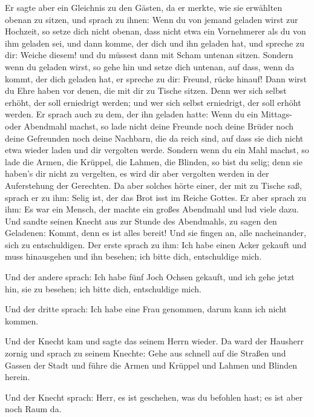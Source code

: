  Er sagte aber ein Gleichnis zu den Gästen, da er merkte,
wie sie erwählten obenan zu sitzen, und sprach zu ihnen: 
Wenn du von jemand geladen wirst zur Hochzeit, so setze dich nicht
obenan, dass nicht etwa ein Vornehmerer als du von ihm geladen sei,
 und dann komme, der dich und ihn geladen hat, und spreche
zu dir: Weiche diesem! und du müssest dann mit Scham untenan sitzen.
 Sondern wenn du geladen wirst, so gehe hin und setze
dich untenan, auf dass, wenn da kommt, der dich geladen hat, er spreche
zu dir: Freund, rücke hinauf! Dann wirst du Ehre haben vor denen, die
mit dir zu Tische sitzen.  Denn wer sich selbst erhöht,
der soll erniedrigt werden; und wer sich selbst erniedrigt, der soll
erhöht werden.  Er sprach auch zu dem, der ihn geladen
hatte: Wenn du ein Mittags- oder Abendmahl machst, so lade nicht deine
Freunde noch deine Brüder noch deine Gefreunden noch deine Nachbarn, die
da reich sind, auf dass sie dich nicht etwa wieder laden und dir
vergolten werde.  Sondern wenn du ein Mahl machst, so
lade die Armen, die Krüppel, die Lahmen, die Blinden,  so
bist du selig; denn sie haben's dir nicht zu vergelten, es wird dir aber
vergolten werden in der Auferstehung der Gerechten.  Da
aber solches hörte einer, der mit zu Tische saß, sprach er zu ihm: Selig
ist, der das Brot isst im Reiche Gottes.  Er aber sprach
zu ihm: Es war ein Mensch, der machte ein großes Abendmahl und lud viele
dazu.  Und sandte seinen Knecht aus zur Stunde des
Abendmahls, zu sagen den Geladenen: Kommt, denn es ist alles bereit!
 Und sie fingen an, alle nacheinander, sich zu
entschuldigen. Der erste sprach zu ihm: Ich habe einen Acker gekauft und
muss hinausgehen und ihn besehen; ich bitte dich, entschuldige mich.

 Und der andere sprach: Ich habe fünf Joch Ochsen
gekauft, und ich gehe jetzt hin, sie zu besehen; ich bitte dich,
entschuldige mich.

 Und der dritte sprach: Ich habe eine Frau genommen,
darum kann ich nicht kommen.

 Und der Knecht kam und sagte das seinem Herrn wieder. Da
ward der Hausherr zornig und sprach zu seinem Knechte: Gehe aus schnell
auf die Straßen und Gassen der Stadt und führe die Armen und Krüppel und
Lahmen und Blinden herein.

 Und der Knecht sprach: Herr, es ist geschehen, was du
befohlen hast; es ist aber noch Raum da.

